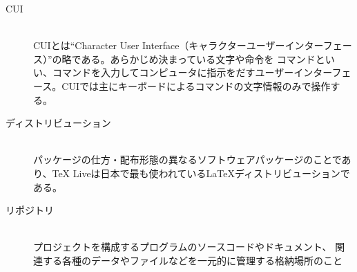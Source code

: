 \documentclass[titlepage]{ltjsarticle}
\begin{document}
\begin{description}
        \item[CUI]~\\
        CUIとは``Character User Interface（キャラクターユーザーインターフェース）''の略である。あらかじめ決まっている文字や命令を コマンドといい、コマンドを入力してコンピュータに指示をだすユーザーインターフェース。CUIでは主にキーボードによるコマンドの文字情報のみで操作する。
        \item[ディストリビューション]~\\
        パッケージの仕方・配布形態の異なるソフトウェアパッケージのことであり、TeX Liveは日本で最も使われているLaTeXディストリビューションである。


  \item [リポジトリ] ~\\
        プロジェクトを構成するプログラムのソースコードやドキュメント、
        関連する各種のデータやファイルなどを一元的に管理する格納場所のこと
\end{description}
\end{document}
